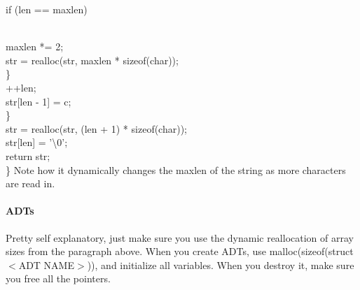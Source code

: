\documentclass[10pt,letter]{article}
\begin{document}
\hspace*{10pt} if (len == maxlen) {\\
\hspace*{15pt} maxlen *= 2;\\
\hspace*{15pt} str = realloc(str, maxlen * sizeof(char));\\
\hspace*{10pt} \}\\
\hspace*{10pt} ++len;\\
\hspace*{10pt} str[len - 1] = c;\\
\hspace*{5pt} \}\\
\hspace*{5pt} str = realloc(str, (len + 1) * sizeof(char));\\
\hspace*{5pt} str[len] = '\textbackslash0';\\
\hspace*{5pt} return str;\\
\}
Note how it dynamically changes the maxlen of the string as more characters are read in. 

\paragraph{ADTs} Pretty self explanatory, just make sure you use the dynamic reallocation of array sizes from the paragraph above. When you create ADTs, use malloc(sizeof(struct $<$ADT NAME$>$)), and initialize all variables. When you destroy it, make sure you free all the pointers. 

}
\end{document}
